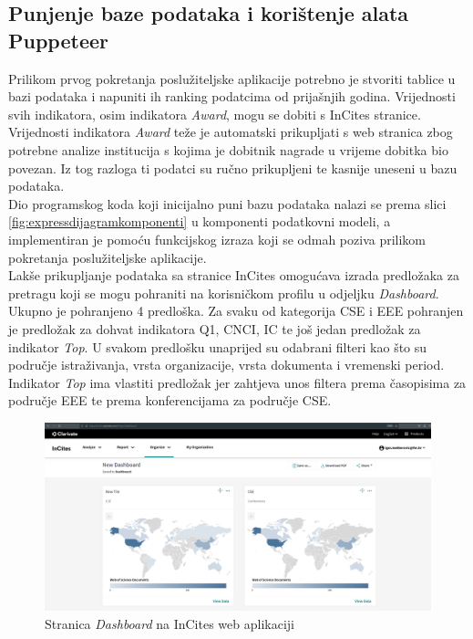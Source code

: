 \documentclass[times, utf8, zavrsni]{fer}
\begin{document}
\subsection{Punjenje baze podataka i korištenje alata\\ Puppeteer}
Prilikom prvog pokretanja poslužiteljske aplikacije potrebno je stvoriti tablice u bazi podataka i napuniti ih ranking podatcima od prijašnjih godina.
Vrijednosti svih indikatora, osim indikatora \emph{Award}, mogu se dobiti s InCites stranice. Vrijednosti indikatora \emph{Award} teže je automatski prikupljati 
s web stranica zbog potrebne analize institucija s kojima je dobitnik nagrade u vrijeme dobitka bio povezan. Iz tog razloga ti podatci 
su ručno prikupljeni te kasnije uneseni u bazu podataka. 
\\Dio programskog koda koji inicijalno puni bazu podataka nalazi se prema slici \ref{fig:expressdijagramkomponenti} u komponenti podatkovni modeli, a 
implementiran je pomoću funkcijskog izraza koji se odmah poziva  prilikom pokretanja 
poslužiteljske aplikacije. \\Lakše prikupljanje podataka sa stranice InCites omogućava izrada predložaka za pretragu koji se mogu pohraniti 
na korisničkom profilu u odjeljku \emph{Dashboard}. Ukupno je pohranjeno 4 predloška. Za svaku od kategorija CSE i EEE pohranjen je predložak 
za dohvat indikatora Q1, CNCI, IC te još jedan predložak za indikator \emph{Top}. U svakom predlošku unaprijed su odabrani filteri kao što su područje istraživanja,
vrsta organizacije, vrsta dokumenta i vremenski period. Indikator \emph{Top} ima vlastiti predložak jer zahtjeva unos filtera prema časopisima za područje EEE te 
prema konferencijama za područje CSE. 
\begin{figure}[htb]
    \hspace*{-2cm} 
       \includegraphics[scale=0.21]{dashboard.png} 
       \caption{Stranica \emph{Dashboard} na InCites web aplikaciji}
       \label{fig:dashboard}
       \end{figure} 
\end{document}
